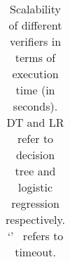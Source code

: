 \begin{table}[t!]
\begin{tabular}{lrrrrrrrrrrrrrrr}
	
		
			
				
				
				
				
				
				
				


    \end{tabular}
\caption{Scalability of different verifiers in terms of execution time (in seconds).  DT and LR refer to decision tree and logistic regression respectively. `\textemdash'~ refers to timeout. }
\label{tab:FS_VF_Justicia}
\end{table}








